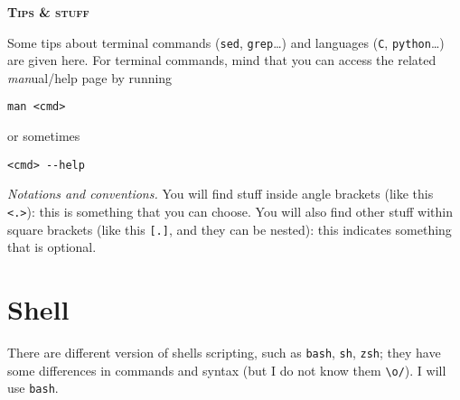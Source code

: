 \documentclass[a4paper,12pt,%
              final%
              ]{article}
\begin{document}
\begin{center}
\bfseries \scshape \Huge \color{BlueX}%
Tips \& stuff
\end{center}
%
\vspace*{\baselineskip}

Some tips about terminal commands (\texttt{sed}, \texttt{grep}\ldots) and languages (\texttt{C}, \texttt{python}\ldots) are given here. For terminal commands, mind that you can access the related \emph{man}ual/help page by running
\begin{verbatim}
man <cmd>
\end{verbatim}
or sometimes
\begin{verbatim}
<cmd> --help
\end{verbatim}

\emph{Notations and conventions.} You will find stuff inside angle brackets (like this \verb|<.>|): this is something that you can choose. You will also find other stuff within square brackets (like this \verb|[.]|, and they can be nested): this indicates something that is optional.

\section{Shell}
\label{sec:shell}
There are different version of shells scripting, such as \texttt{bash}, \texttt{sh}, \texttt{zsh}; they have some differences in commands and syntax (but I do not know them \verb|\o/|). I will use \texttt{bash}.
\end{document}
